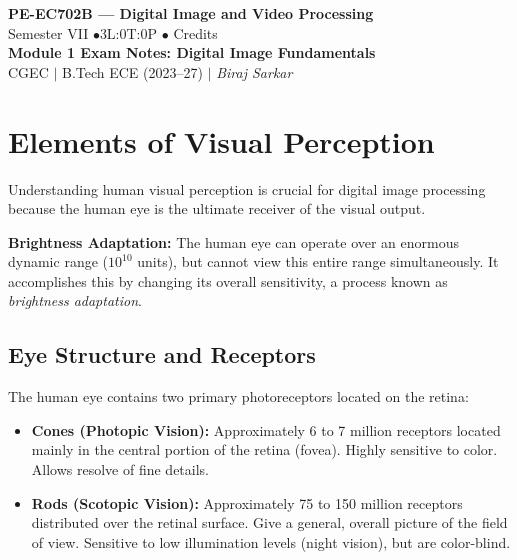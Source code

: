 \documentclass[12pt,a4paper]{article}
\begin{document}

\begin{center}
  {\LARGE\bfseries\color{myred} PE-EC702B --- Digital Image and Video Processing}\\[5pt]
  {\normalsize\color{mydark} Semester VII \quad$\bullet$\quad 3L:0T:0P \quad$\bullet$ Credits}\\[3pt]
  {\normalsize\color{myteal}\textbf{Module 1 Exam Notes: Digital Image Fundamentals}}\\[3pt]
  {\small\color{mydark} CGEC \;$|$\; B.Tech ECE (2023--27) \;$|$\; \textit{Biraj Sarkar}}
\end{center}
\vspace{2pt}
\noindent{\color{myred}\rule{\linewidth}{1.5pt}}
\vspace{2pt}

\hypersetup{linkcolor=mydark}
\tableofcontents
\hypersetup{linkcolor=myteal}
\newpage

\section{Elements of Visual Perception}

Understanding human visual perception is crucial for digital image processing because the human eye is the ultimate receiver of the visual output.

\begin{tcolorbox}[defbox, title={Visual Perception Fundamentals}]
\textbf{Brightness Adaptation:} The human eye can operate over an enormous dynamic range ($10^{10}$ units), but cannot view this entire range simultaneously. It accomplishes this by changing its overall sensitivity, a process known as \textit{brightness adaptation}.
\end{tcolorbox}

\subsection{Eye Structure and Receptors}
The human eye contains two primary photoreceptors located on the retina:
\begin{itemize}[leftmargin=*, itemsep=2.5pt]
  \item \textbf{Cones (Photopic Vision):} Approximately 6 to 7 million receptors located mainly in the central portion of the retina (fovea). Highly sensitive to color. Allows resolve of fine details.
  \item \textbf{Rods (Scotopic Vision):} Approximately 75 to 150 million receptors distributed over the retinal surface. Give a general, overall picture of the field of view. Sensitive to low illumination levels (night vision), but are color-blind.
\end{itemize}
\end{document}
